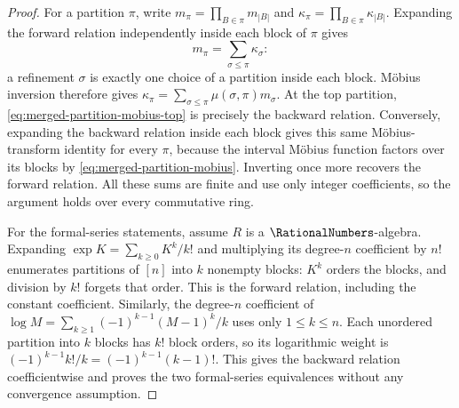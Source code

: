 \documentclass[11pt,a4paper,oneside,openany]{book}
\theoremstyle{definition}
\theoremstyle{remark}
\begin{document}
\begin{proof}
For a partition $\pi$, write $m_\pi=\prod_{B\in\pi}m_{|B|}$ and
$\kappa_\pi=\prod_{B\in\pi}\kappa_{|B|}$.
Expanding the forward relation independently inside each block of $\pi$
gives
\[
 m_\pi=\sum_{\sigma\leq\pi}\kappa_\sigma:
\]
a refinement $\sigma$ is exactly one choice of a partition inside each
block.  Möbius inversion therefore gives
$\kappa_\pi=\sum_{\sigma\leq\pi}\mu(\sigma,\pi)m_\sigma$.
At the top partition, \eqref{eq:merged-partition-mobius-top} is precisely
the backward relation.  Conversely, expanding the backward relation inside
each block gives this same Möbius-transform identity for every $\pi$,
because the interval Möbius function factors over its blocks by
\eqref{eq:merged-partition-mobius}.  Inverting once more recovers the
forward relation.  All these sums are finite and use only integer
coefficients, so the argument holds over every commutative ring.

For the formal-series statements, assume $R$ is a $\RationalNumbers$-algebra.
Expanding $\exp K=\sum_{k\geq0}K^k/k!$ and multiplying its degree-$n$
coefficient by $n!$ enumerates partitions of $[n]$ into $k$ nonempty
blocks: $K^k$ orders the blocks, and division by $k!$ forgets that order.
This is the forward relation, including the constant coefficient.
Similarly, the degree-$n$ coefficient of
$\log M=\sum_{k\geq1}(-1)^{k-1}(M-1)^k/k$
uses only $1\leq k\leq n$.
Each unordered partition into $k$ blocks has $k!$ block orders, so its
logarithmic weight is $(-1)^{k-1}k!/k=(-1)^{k-1}(k-1)!$.
This gives the backward relation coefficientwise and proves the two
formal-series equivalences without any convergence assumption.
\end{proof}
\end{document}
